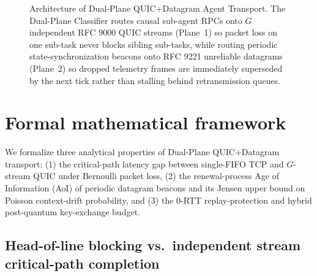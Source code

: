 \documentclass[11pt]{article}
\begin{document}
\begin{figure}[ht]
{%
}
\caption{Architecture of Dual-Plane QUIC+Datagram Agent Transport. The Dual-Plane Classifier routes causal sub-agent RPCs onto $G$ independent RFC 9000 QUIC streams (Plane~1) so packet loss on one sub-task never blocks sibling sub-tasks, while routing periodic state-synchronization beacons onto RFC 9221 unreliable datagrams (Plane~2) so dropped telemetry frames are immediately superseded by the next tick rather than stalling behind retransmission queues.}
\label{fig:architecture}
\end{figure}

\section{Formal mathematical framework}\label{sec:formal}

We formalize three analytical properties of Dual-Plane QUIC+Datagram transport: (1) the critical-path latency gap between single-FIFO TCP and $G$-stream QUIC under Bernoulli packet loss, (2) the renewal-process Age of Information (AoI) of periodic datagram beacons and its Jensen upper bound on Poisson context-drift probability, and (3) the 0-RTT replay-protection and hybrid post-quantum key-exchange budget.

\subsection{Head-of-line blocking vs.\ independent stream critical-path completion}
\end{document}

